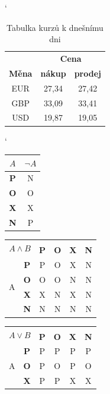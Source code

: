 \documentclass[11pt,a4paper,onecolumn]{article}
\begin{document}
\begin{table}[ht]
\catcode`
\begin{center}
\begin{tabular}[p]{| c | c | c |}
\hline 
& \multicolumn{2}{c|}{\bfseries Cena} \\\cline{2-3}
\textbf{Měna} &  \textbf{nákup} & \textbf{prodej} \\\hline
EUR  & 27,34 & 27,42 \\
GBP  & 33,09 & 33,41 \\
USD  & 19,87 & 19,05 \\\hline
\end{tabular}
\caption{Tabulka kurzů k dnešnímu dni}
\end{center}
\end{table}
\begin{table}[ht]
\begin{center}
\catcode`
\begin{tabular}[p]{|>{\bfseries}c|c|}\hline
$A$ & $\neg A$ \\\hline
P & N \\\hline
O & O \\\hline
X & X \\\hline
N & P \\\hline
\end{tabular}
\begin{tabular}[p]{|c|>{\bfseries}c|c|c|c|c|}\hline
\multicolumn{2}{|c|}{\multirow{2}{*}{$A \wedge B$}} & \multicolumn{4}{c|}{$B$} \\\cline{3-6}
\multicolumn{2}{|c|}{} & \textbf{P} & \textbf{O} & \textbf{X} & \textbf{N}  \\\hline
\multirow{4}{*}{A} 
  & P & P & O & X & N\\\cline{2-6}
  & O & O & O & N & N\\\cline{2-6}
  & X & X & N & X & N\\\cline{2-6}
  & N & N & N & N & N\\\hline
\end{tabular}
\begin{tabular}[p]{|c|>{\bfseries}c|c|c|c|c|}\hline
\multicolumn{2}{|c|}{\multirow{2}{*}{$A \vee B$}} & \multicolumn{4}{c|}{$B$} \\\cline{3-6}
\multicolumn{2}{|c|}{} & \textbf{P} & \textbf{O} & \textbf{X} & \textbf{N}  \\\hline
\multirow{4}{*}{A} 
  & P & P & P & P & P\\\cline{2-6}
  & O & P & O & P & O\\\cline{2-6}
  & X & P & P & X & X\\\cline{2-6}

\end{tabular}
\end{center}
\end{table}
\end{document}
